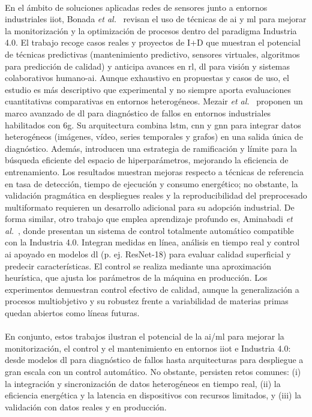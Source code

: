 \\
En el ámbito de soluciones aplicadas redes de sensores junto a entornos industriales \gls{iiot}, Bonada \textit{et al.}~\cite{Bonada20} revisan el uso de técnicas de \gls{ai} y \gls{ml} para mejorar la monitorización y la optimización de procesos dentro del paradigma Industria 4.0. El trabajo recoge casos reales y proyectos de I+D que muestran el potencial de técnicas predictivas (mantenimiento predictivo, sensores virtuales, algoritmos para predicción de calidad) y anticipa avances en \gls{rl}, \gls{dl} para visión y sistemas colaborativos humano-\gls{ai}. Aunque exhaustivo en propuestas y casos de uso, el estudio es más descriptivo que experimental y no siempre aporta evaluaciones cuantitativas comparativas en entornos heterogéneos. Mezair \textit{et al.}~\cite{Mezair22} proponen un marco avanzado de \gls{dl} para diagnóstico de fallos en entornos industriales habilitados con \gls{6g}. Su arquitectura combina \gls{lstm}, \gls{cnn} y \gls{gnn} para integrar datos heterogéneos (imágenes, vídeo, series temporales y grafos) en una salida única de diagnóstico. Además, introducen una estrategia de ramificación y límite para la búsqueda eficiente del espacio de hiperparámetros, mejorando la eficiencia de entrenamiento. Los resultados muestran mejoras respecto a técnicas de referencia en tasa de detección, tiempo de ejecución y consumo energético; no obstante, la validación pragmática en despliegues reales y la reproducibilidad del preprocesado multiformato requieren un desarrollo adicional para su adopción industrial. De forma similar, otro trabajo que emplea aprendizaje profundo es, Aminabadi \textit{et al.}~\cite{Aminabadi22}, donde presentan un sistema de control  totalmente automático compatible con la Industria 4.0. Integran medidas en línea, análisis en tiempo real y control \gls{ai} apoyado en modelos \gls{dl} (p. ej. ResNet-18) para evaluar calidad superficial y predecir características. El control se realiza mediante una aproximación heurística, que ajusta los parámetros de la máquina en producción. Los experimentos demuestran control efectivo de calidad, aunque la generalización a procesos multiobjetivo y su robustez frente a variabilidad de materias primas quedan abiertos como líneas futuras.\\
\\
En conjunto, estos trabajos ilustran el potencial de la \gls{ai}/\gls{ml} para mejorar la monitorización, el control y el mantenimiento en entornos \gls{iiot} e Industria 4.0: desde modelos \gls{dl} para diagnóstico de fallos hasta arquitecturas para despliegue a gran escala con un control automático. No obstante, persisten retos comunes: (i) la integración y sincronización de datos heterogéneos en tiempo real, (ii) la eficiencia energética y la latencia en dispositivos con recursos limitados, y (iii) la validación con datos reales y en producción. 

